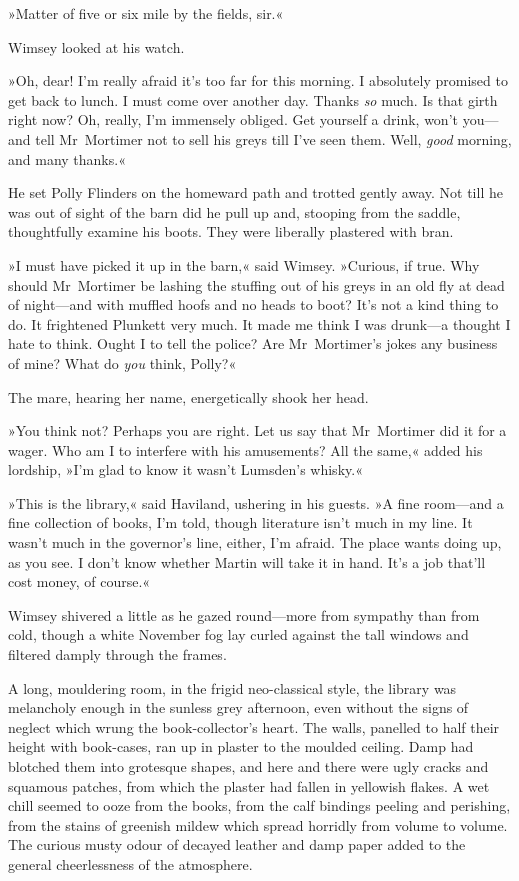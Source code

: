 »Matter of five or six mile by the fields, sir.«

Wimsey looked at his watch.

»Oh, dear! I'm really afraid it's too far for this morning. I absolutely promised to get back to lunch. I must come over another day. Thanks \textit{so} much. Is that girth right now? Oh, really, I'm immensely obliged. Get yourself a drink, won't you—and tell Mr~Mortimer not to sell his greys till I've seen them. Well, \textit{good} morning, and many thanks.«

He set Polly Flinders on the homeward path and trotted gently away. Not till he was out of sight of the barn did he pull up and, stooping from the saddle, thoughtfully examine his boots. They were liberally plastered with bran.

»I must have picked it up in the barn,« said Wimsey. »Curious, if true. Why should Mr~Mortimer be lashing the stuffing out of his greys in an old fly at dead of night—and with muffled hoofs and no heads to boot? It's not a kind thing to do. It frightened Plunkett very much. It made me think I was drunk—a thought I hate to think. Ought I to tell the police? Are Mr~Mortimer's jokes any business of mine? What do \textit{you} think, Polly?«

The mare, hearing her name, energetically shook her head.

»You think not? Perhaps you are right. Let us say that Mr~Mortimer did it for a wager. Who am I to interfere with his amusements? All the same,« added his lordship, »I'm glad to know it wasn't Lumsden's whisky.«

\divider
»This is the library,« said Haviland, ushering in his guests. »A fine room—and a fine collection of books, I'm told, though literature isn't much in my line. It wasn't much in the governor's line, either, I'm afraid. The place wants doing up, as you see. I don't know whether Martin will take it in hand. It's a job that'll cost money, of course.«

Wimsey shivered a little as he gazed round—more from sympathy than from cold, though a white November fog lay curled against the tall windows and filtered damply through the frames.

A long, mouldering room, in the frigid neo-classical style, the library was melancholy enough in the sunless grey afternoon, even without the signs of neglect which wrung the book-collector's heart. The walls, panelled to half their height with book-cases, ran up in plaster to the moulded ceiling. Damp had blotched them into grotesque shapes, and here and there were ugly cracks and squamous patches, from which the plaster had fallen in yellowish flakes. A wet chill seemed to ooze from the books, from the calf bindings peeling and perishing, from the stains of greenish mildew which spread horridly from volume to volume. The curious musty odour of decayed leather and damp paper added to the general cheerlessness of the atmosphere.

